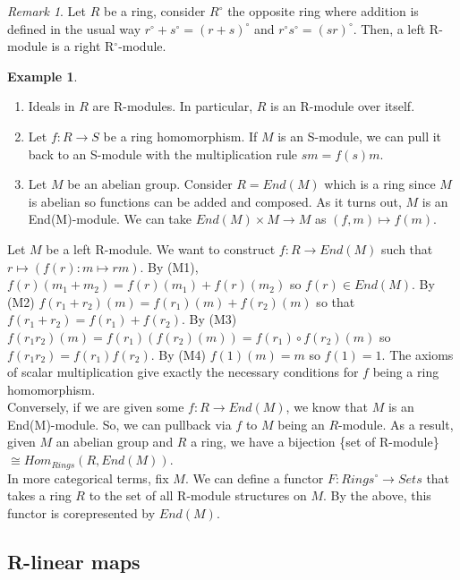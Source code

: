 \documentclass{article}
\theoremstyle{definition}
\newtheorem{eg}{Example}[subsection]
\theoremstyle{remark}
\newtheorem*{remark}{Remark}
\theoremstyle{plain}
\begin{document}
\begin{remark}
    Let \(R\) be a ring, consider \(R^{\circ}\) the opposite ring where addition is defined in the usual way
    \(r^{\circ} + s^{\circ} = (r+s)^{\circ}\) and \(r^{\circ}s^{\circ} = (sr)^{\circ}\). Then, a left R-module is a right
    R\(^{\circ}\)-module.
\end{remark}

\begin{eg}
    \begin{enumerate}
        \item Ideals in \(R\) are R-modules. In particular, \(R\) is an R-module over itself. 
        \item Let \(f: R \to S\) be a ring homomorphism. If \(M\) is an S-module, we can pull it back
        to an S-module with the multiplication rule \(sm = f(s)m\).
        \item Let \(M\) be an abelian group. Consider \(R = End(M)\) which is a ring since \(M\) is abelian so
        functions can be added and composed. As it turns out, \(M\) is an End(M)-module. We can take \(End(M)\times M \to M\)
        as \((f,m) \mapsto f(m)\).
    \end{enumerate}
\end{eg}

Let \(M\) be a left R-module. We want to construct \(f: R \to End(M)\) such that
\(r \mapsto (f(r):m\mapsto rm)\). By (M1), \(f(r)(m_1 + m_2) = f(r)(m_1) +f(r)(m_2)\)
so \(f(r) \in End(M)\). By (M2) \(f(r_1 + r_2)(m) = f(r_1)(m) + f(r_2)(m)\) so that
\(f(r_1 + r_2) = f(r_1)+f(r_2)\). By (M3) \(f(r_1r_2)(m) = f(r_1)(f(r_2)(m)) = f(r_1)\circ f(r_2)(m)\)
so \(f(r_1r_2) = f(r_1)f(r_2)\). By (M4) \(f(1)(m) = m\) so \(f(1) = 1\). The axioms of scalar multiplication
give exactly the necessary conditions for \(f\) being a ring homomorphism. \\
Conversely, if we are given some \(f: R \to End(M)\), we know that \(M\) is an End(M)-module. So, we can pullback via \(f\)
to \(M\) being an \(R\)-module. As a result, given \(M\) an abelian group and \(R\) a ring, we have a bijection \{set of R-module\}
\(\cong Hom_{Rings}(R, End(M))\).\\

In more categorical terms, fix \(M\). We can define a functor \(F: Rings^{\circ} \to Sets\) that takes a ring \(R\) to the set of all
R-module structures on \(M\). By the above, this functor is corepresented by \(End(M)\).

\subsection{R-linear maps}
\end{document}
